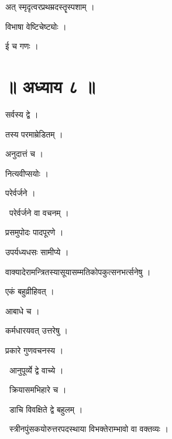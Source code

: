 \documentclass[10pt, openany, oneside]{book}
\begin{document}
\noindent अत् स्मृदृत्वरप्रथम्रदस्तॄस्पशाम् ।

\noindent विभाषा वेष्टिचेष्ट्योः ।

\noindent ई च गणः ।

\section*{॥ अध्याय ८ ॥}

\noindent सर्वस्य द्वे ।

\noindent तस्य परमाम्रेडितम् ।

\noindent अनुदात्तं च ।

\noindent नित्यवीप्सयोः ।

\noindent परेर्वर्जने ।

\par\noindent\hspace{1.5em}{\vps वा॰}~{\qt परेर्वर्जने वा वचनम् ।}

\noindent प्रसमुपोदः पादपूरणे ।

\noindent उपर्यध्यधसः सामीप्ये ।

\noindent वाक्यादेरामन्त्रितस्यासूयासम्मतिकोपकुत्सनभर्त्सनेषु ।

\noindent एकं बहुव्रीहिवत् ।

\noindent आबाधे च ।

\noindent कर्मधारयवत् उत्तरेषु ।

\noindent प्रकारे गुणवचनस्य ।

\par\noindent\hspace{1.5em}{\vps वा॰}~{\qt आनुपूर्व्ये द्वे वाच्ये ।}

\par\noindent\hspace{1.5em}{\vps वा॰}~{\qt क्रियासमभिहारे च ।}

\par\noindent\hspace{1.5em}{\vps वा॰}~{\qt डाचि विवक्षिते द्वे बहुलम् ।}

\par\noindent\hspace{1.5em}{\vps वा॰}~{\qt स्त्रीनपुंसकयोरुत्तरपदस्थाया विभक्तेराम्भावो वा वक्तव्यः ।}
\end{document}
